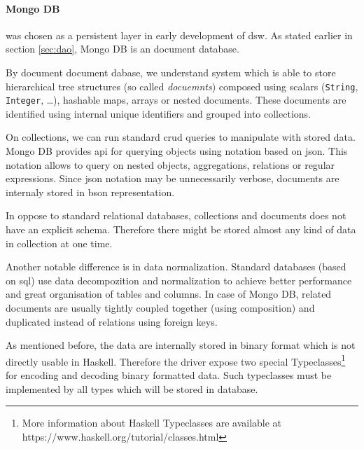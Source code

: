 
\paragraph*{Mongo DB}\label{sec:mongo-db} was chosen as a persistent layer in early development of \gls{dsw}.
As stated earlier in section \ref{sec:dao}, Mongo DB is an document database.

By document document dabase, we understand system which is able to store hierarchical tree structures (so called \textit{docuemnts}) composed using scalars (\texttt{String}, \texttt{Integer}, \dots), hashable maps, arrays or nested documents.
These documents are identified using internal unique identifiers and grouped into collections.

On collections, we can run standard \gls{crud} queries to manipulate with stored data.
Mongo DB provides \gls{api} for querying objects using notation based on \gls{json}.
This notation allows to query on nested objects, aggregations, relations or regular expressions.
Since \gls{json} notation may be unnecessarily verbose, documents are internaly stored in \gls{bson} representation.


In oppose to standard relational databases, collections and documents does not have an explicit schema.
Therefore there might be stored almost any kind of data in collection at one time.

Another notable difference is in data normalization.
Standard databases (based on \gls{sql}) use data decompozition and normalization to achieve better performance and great organisation of tables and columns.
In case of Mongo DB, related documents are usually tightly coupled together (using composition) and duplicated instead of relations using foreign keys.

As mentioned before, the data are internally stored in binary format which is not directly usable in Haskell.
Therefore the driver expose two special Typeclasses\footnote{More information about Haskell Typeclasses are available at https://www.haskell.org/tutorial/classes.html} for encoding and decoding binary formatted data.
Such typeclasses must be implemented by all types which will be stored in database.


